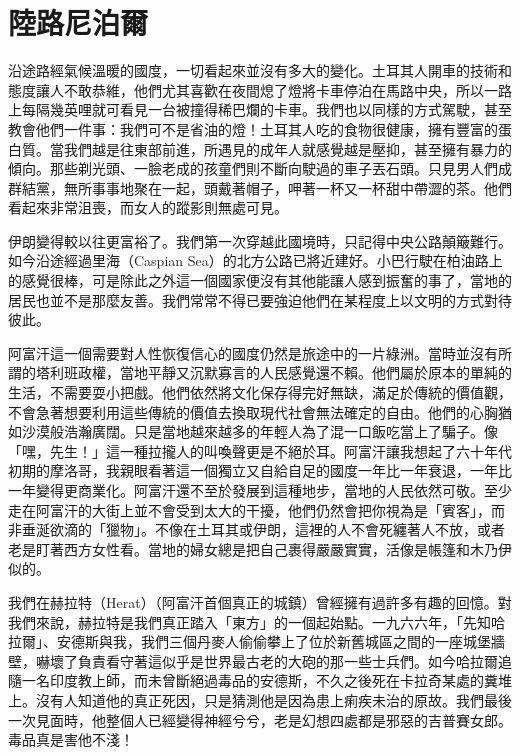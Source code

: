 \chapter{陸路尼泊爾}

沿途路經氣候溫暖的國度，一切看起來並沒有多大的變化。土耳其人開車的技術和態度讓人不敢恭維，他們尤其喜歡在夜間熄了燈將卡車停泊在馬路中央，所以一路上每隔幾英哩就可看見一台被撞得稀巴爛的卡車。我們也以同樣的方式駕駛，甚至教會他們一件事：我們可不是省油的燈！土耳其人吃的食物很健康，擁有豐富的蛋白質。當我們越是往東部前進，所遇見的成年人就感覺越是壓抑，甚至擁有暴力的傾向。那些剃光頭、一臉老成的孩童們則不斷向駛過的車子丟石頭。只見男人們成群結黨，無所事事地聚在一起，頭戴著帽子，呷著一杯又一杯甜中帶澀的茶。他們看起來非常沮喪，而女人的蹤影則無處可見。

伊朗變得較以往更富裕了。我們第一次穿越此國境時，只記得中央公路顛簸難行。如今沿途經過里海（Caspian
Sea）的北方公路已將近建好。小巴行駛在柏油路上的感覺很棒，可是除此之外這一個國家便沒有其他能讓人感到振奮的事了，當地的居民也並不是那麼友善。我們常常不得已要強迫他們在某程度上以文明的方式對待彼此。

阿富汗這一個需要對人性恢復信心的國度仍然是旅途中的一片綠洲。當時並沒有所謂的塔利班政權，當地平靜又沉默寡言的人民感覺還不賴。他們屬於原本的單純的生活，不需要耍小把戲。他們依然將文化保存得完好無缺，滿足於傳統的價值觀，不會急著想要利用這些傳統的價值去換取現代社會無法確定的自由。他們的心胸猶如沙漠般浩瀚廣闊。只是當地越來越多的年輕人為了混一口飯吃當上了騙子。像「嘿，先生！」這一種拉攏人的叫喚聲更是不絕於耳。阿富汗讓我想起了六十年代初期的摩洛哥，我親眼看著這一個獨立又自給自足的國度一年比一年衰退，一年比一年變得更商業化。阿富汗還不至於發展到這種地步，當地的人民依然可敬。至少走在阿富汗的大街上並不會受到太大的干擾，他們仍然會把你視為是「賓客」，而非垂涎欲滴的「獵物」。不像在土耳其或伊朗，這裡的人不會死纏著人不放，或者老是盯著西方女性看。當地的婦女總是把自己裹得嚴嚴實實，活像是帳篷和木乃伊似的。


我們在赫拉特（Herat）（阿富汗首個真正的城鎮）曾經擁有過許多有趣的回憶。對我們來說，赫拉特是我們真正踏入「東方」的一個起始點。一九六六年，「先知哈拉爾」、安德斯與我，我們三個丹麥人偷偷攀上了位於新舊城區之間的一座城堡牆壁，嚇壞了負責看守著這似乎是世界最古老的大砲的那一些士兵們。如今哈拉爾追隨一名印度教上師，而未曾斷絕過毒品的安德斯，不久之後死在卡拉奇某處的糞堆上。沒有人知道他的真正死因，只是猜測他是因為患上痢疾未治的原故。我們最後一次見面時，他整個人已經變得神經兮兮，老是幻想四處都是邪惡的吉普賽女郎。毒品真是害他不淺！

